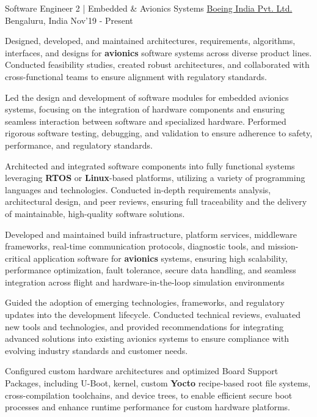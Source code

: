 \begin{cventries}
    \cventry
	{\large Software Engineer 2 | Embedded \& Avionics Systems}
	{\href{https://www.boeing.co.in/}{\large Boeing India Pvt. Ltd.}}
	{\large Bengaluru, India}
	{\large Nov'19 - Present}
	{
		\begin{cvitems}
		\item{\large Designed, developed, and maintained architectures, requirements, algorithms, interfaces, and designs for \textbf{avionics} software systems across diverse product lines. Conducted feasibility studies, created robust architectures, and collaborated with cross-functional teams to ensure alignment with regulatory standards.}
        \item{\large Led the design and development of software modules for embedded avionics systems, focusing on the integration of hardware components and ensuring seamless interaction between software and specialized hardware. Performed rigorous software testing, debugging, and validation to ensure adherence to safety, performance, and regulatory standards.}
		\item{\large Architected and integrated software components into fully functional systems leveraging \textbf{RTOS} or \textbf{Linux}-based platforms, utilizing a variety of programming languages and technologies. Conducted in-depth requirements analysis, architectural design, and peer reviews, ensuring full traceability and the delivery of maintainable, high-quality software solutions.}
		\item{\large Developed and maintained build infrastructure, platform services, middleware frameworks, real-time communication protocols, diagnostic tools, and mission-critical application software for \textbf{avionics} systems, ensuring high scalability, performance optimization, fault tolerance, secure data handling, and seamless integration across flight and hardware-in-the-loop simulation environments}
        \item{\large Guided the adoption of emerging technologies, frameworks, and regulatory updates into the development lifecycle. Conducted technical reviews, evaluated new tools and technologies, and provided recommendations for integrating advanced solutions into existing avionics systems to ensure compliance with evolving industry standards and customer needs.}
		\item{\large Configured custom hardware architectures and optimized Board Support Packages, including U-Boot, kernel, custom \textbf{Yocto} recipe-based root file systems, cross-compilation toolchains, and device trees, to enable efficient secure boot processes and enhance runtime performance for custom hardware platforms.}

\end{cvitems}}
\end{cventries}
